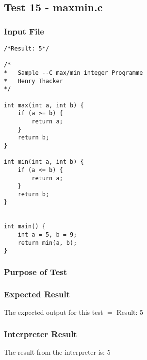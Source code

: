 \subsection{Test 15 - maxmin.c}
\subsubsection{Input File}
\begin{lstlisting}[showstringspaces=false,breaklines=true,backgroundcolor=\color{light-gray}, captionpos=b]
/*Result: 5*/

/*
*	Sample --C max/min integer Programme
*	Henry Thacker
*/

int max(int a, int b) {
	if (a >= b) {
		return a;
	}
	return b;
}

int min(int a, int b) {
	if (a <= b) {
		return a;
	}
	return b;
}


int main() {
	int a = 5, b = 9;
	return min(a, b);
}
\end{lstlisting}\subsubsection{Purpose of Test}

\subsubsection{Expected Result}
The expected output for this test $=$ Result: 5
\subsubsection{Interpreter Result}
The result from the interpreter is: 5
